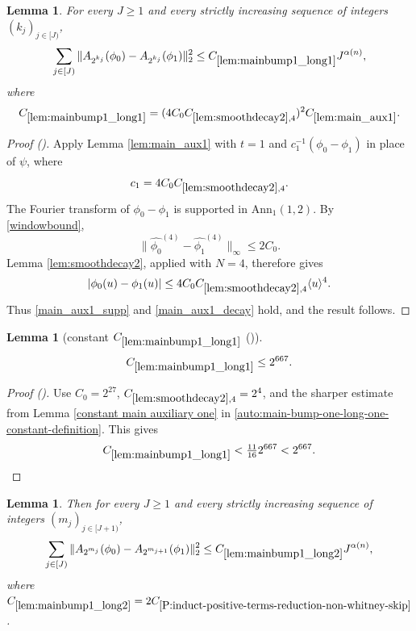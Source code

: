 \documentclass[12pt,reqno]{amsart}
\newcommand{\auto}{{({\tiny\faCar})}}
\theoremstyle{plain}
\newtheorem{lemma}[theorem]{Lemma}
\numberwithin{equation}{section}
\theoremstyle{remark}
\newcommand{\using}[1]{}
\begin{document}
\begin{lemma}\label{lem:mainbump1_long1}\using{lem:main_aux1}\using{lem:smoothdecay2}
For every $J\ge1$ and every strictly increasing sequence of integers $(k_j)_{j\in[J)}$,
\begin{equation}\label{mainbump1_long1}
\sum_{j\in[J)}\|A_{2^{k_j}}(\phi_0)-A_{2^{k_j}}(\phi_1)\|_2^2
\le C_{\ref{lem:mainbump1_long1}}J^{\alpha(n)},
\end{equation}
where
\begin{equation}\label{auto:main-bump-one-long-one-constant-definition}
C_{\ref{lem:mainbump1_long1}}
=(4C_0C_{\ref{lem:smoothdecay2},4})^2C_{\ref{lem:main_aux1}}.
\end{equation}
\end{lemma}

\begin{proof}[Proof \auto]
Apply Lemma \ref{lem:main_aux1} with $t=1$ and $c_1^{-1}(\phi_0-\phi_1)$ in place of $\psi$, where
\[
c_1=4C_0C_{\ref{lem:smoothdecay2},4}.
\]
The Fourier transform of $\phi_0-\phi_1$ is supported in $\mathrm{Ann}_1(1,2)$. By \eqref{windowbound},
\[
\|\widehat{\phi_0}^{(4)}-\widehat{\phi_1}^{(4)}\|_\infty\le2C_0.
\]
Lemma \ref{lem:smoothdecay2}, applied with $N=4$, therefore gives
\[
|\phi_0(u)-\phi_1(u)|
\le4C_0C_{\ref{lem:smoothdecay2},4}\langle u\rangle^4.
\]
Thus \eqref{main_aux1_supp} and \eqref{main_aux1_decay} hold, and the result follows.
\end{proof}

\begin{lemma}[constant $C_{\ref{lem:mainbump1_long1}}$ \auto]\label{constant main bump one long one}\using{lem:smoothdecay2}\using{constant main auxiliary one}\using{lem:mainbump1_long1}
\begin{equation}\label{constant main bump one long one bound}
C_{\ref{lem:mainbump1_long1}}\le2^{667}.
\end{equation}
\end{lemma}
\begin{proof}[Proof \auto]
Use $C_0=2^{27}$, $C_{\ref{lem:smoothdecay2},4}=2^4$, and the sharper estimate from Lemma \ref{constant main auxiliary one} in \eqref{auto:main-bump-one-long-one-constant-definition}. This gives
\[
C_{\ref{lem:mainbump1_long1}}<\tfrac{11}{16}2^{667}<2^{667}.
\]
\end{proof}


\begin{lemma}\label{lem:mainbump1_long2}\using{Extension of sequences}\using{A to Lambda}\using{P:induct-positive-terms-reduction-non-whitney-skip}\using{Operations on spaced sequences}
Then for every $J\ge 1$ and every strictly increasing sequence of integers $(m_j)_{j\in[J+1)}$,
\begin{equation}\label{mainbump1_long2}
\sum_{j\in[J)} \|
A_{2^{m_{j}}}(\phi_0)-A_{2^{m_{j+1}}}(\phi_1) \|_{2}^2  \le C_{\ref{lem:mainbump1_long2}} J^{\alpha(n)},\end{equation}
where $C_{\ref{lem:mainbump1_long2}}=2 C_{\ref{P:induct-positive-terms-reduction-non-whitney-skip}}$.
\end{lemma}
\end{document}
